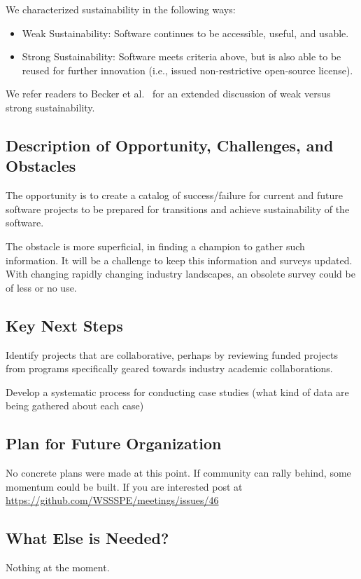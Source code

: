 We characterized sustainability in the following ways:
\begin{itemize}

\item Weak Sustainability: Software continues to be accessible, useful, and
usable.

\item Strong Sustainability: Software meets criteria above, but is also able to
be reused for further innovation (i.e., issued non-restrictive open-source
license).

\end{itemize}
We refer readers to Becker et al.~\cite{Becker:2014} for an extended discussion of weak versus strong
sustainability. 

\subsection{Description of Opportunity, Challenges, and Obstacles}
The opportunity is to create a catalog of success/failure for current and future software projects to be prepared for transitions and achieve sustainability of the software. 

The obstacle is more superficial, in finding a champion to gather such information. It will be a challenge to keep this information and surveys updated. With changing rapidly changing industry landscapes, an obsolete survey could be of less or no use. 

\subsection{Key Next Steps}

Identify projects that are collaborative, perhaps by reviewing funded projects from programs specifically geared towards industry academic collaborations.

Develop a systematic process for conducting case studies (what kind of data are being gathered about each case)

\subsection{Plan for Future Organization}
No concrete plans were made at this point. If community can rally behind, some momentum could be built. If you are interested post at \url{https://github.com/WSSSPE/meetings/issues/46} 

\subsection{What Else is Needed?}
Nothing at the moment. 


